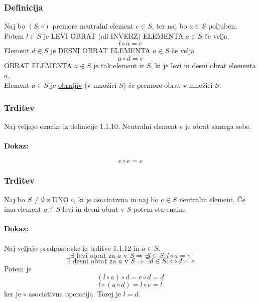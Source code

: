\subsubsection{Definicija}
Naj bo $(S, \circ)$ premore neutralni element $e \in S$, ter naj bo $a \in S$ poljuben. \\[1em]
Potem $l \in S$ je LEVI OBRAT (ali INVERZ) ELEMENTA $a \in S$ če velja
$$l \circ a = e$$
Element $d \in S$ je DESNI OBRAT ELEMENTA $a \in S$ če velja
$$a \circ d = e$$
OBRAT ELEMENTA $a \in S$ je tak element iz $S$, ki je levi in desni obrat elementa $a$. \\[1em]
Element $a \in S$ je \underline{obrnljiv} (v množici $S$) če premore obrat v množici $S$.

\subsubsection{Trditev}
Naj veljajo oznake iz definicije 1.1.10. 
Neutralni element $e$ je obrat samega sebe.

\paragraph{Dokaz:}
$$e \circ e = e$$

\subsubsection{Trditev}
Naj bo $S \ne \emptyset$ z DNO $\circ$, ki je asociativna in naj bo
$e \in S$ neutralni element. Če ima element $a \in S$ levi in desni obrat v $S$
potem sta enaka.

\paragraph{Dokaz:} Naj veljajo predpostavke iz trditve 1.1.12 in $a \in S$.
$$ \exists \text{ levi obrat za } a \text{ v } S \Rightarrow \exists l \in S: l \circ a = e $$
$$ \exists \text{ desni obrat za } a \text{ v } S \Rightarrow \exists d \in S: a \circ d = e $$
Potem je
$$ (l \circ a) \circ d = e \circ d = d $$
$$ l \circ (a \circ d) = l \circ e = l $$
ker je $\circ$ asociativna operacija. Torej je $l = d$.

